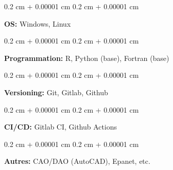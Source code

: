 \documentclass[10pt, letterpaper]{article}
\newenvironment{onecolentry}{
  \begin{adjustwidth}{
    0.2 cm + 0.00001 cm
  }{
    0.2 cm + 0.00001 cm
  }
}{
  \end{adjustwidth}
} %
\begin{document}
  \begin{onecolentry}
    \textbf{OS:} Windows, Linux
  \end{onecolentry}

  \vspace{0.1 cm}

  \begin{onecolentry}
    \textbf{Programmation:} R, Python (base), Fortran (base)
  \end{onecolentry}

  \vspace{0.1 cm}

  \begin{onecolentry}
    \textbf{Versioning:} Git, Gitlab, Github
  \end{onecolentry}

  \vspace{0.1 cm}

  \begin{onecolentry}
    \textbf{CI/CD:} Gitlab CI, Github Actions
  \end{onecolentry}

  \vspace{0.1 cm}

  \begin{onecolentry}
    \textbf{Autres:} CAO/DAO (AutoCAD), Epanet, etc.
  \end{onecolentry}

\end{document}
